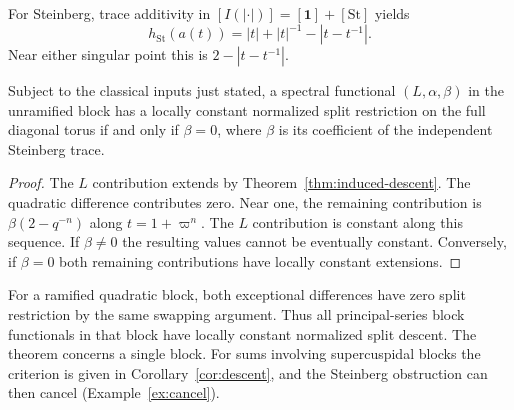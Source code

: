 For Steinberg, trace additivity in $[I(|\cdot|)]=[\mathbf1]+[\mathrm{St}]$ yields
\[
h_{\mathrm{St}}(a(t))=|t|+|t|^{-1}-|t-t^{-1}|.
\]
Near either singular point this is $2-|t-t^{-1}|$.

\begin{theorem}\label{thm:unramified-descent}
Subject to the classical inputs just stated, a spectral functional $(L,\alpha,\beta)$ in the unramified block has a locally constant normalized split restriction on the full diagonal torus if and only if $\beta=0$, where $\beta$ is its coefficient of the independent Steinberg trace.
\end{theorem}
\begin{proof}
The $L$ contribution extends by Theorem~\ref{thm:induced-descent}. The quadratic difference contributes zero. Near one, the remaining contribution is $\beta(2-q^{-n})$ along $t=1+\varpi^n$. The $L$ contribution is constant along this sequence. If $\beta\ne0$ the resulting values cannot be eventually constant. Conversely, if $\beta=0$ both remaining contributions have locally constant extensions.
\end{proof}
For a ramified quadratic block, both exceptional differences have zero split restriction by the same swapping argument. Thus all principal-series block functionals in that block have locally constant normalized split descent. The theorem concerns a single block. For sums involving supercuspidal blocks the criterion is given in Corollary~\ref{cor:descent}, and the Steinberg obstruction can then cancel (Example~\ref{ex:cancel}).

\begin{center}
\end{center}

